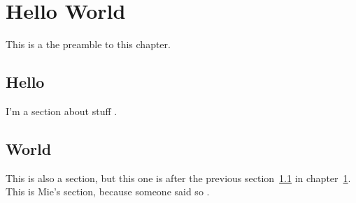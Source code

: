\chapter{Hello World}\label{sec:hello-world}

This is a the preamble to this chapter.

\section{Hello}\label{sec:hello}

I'm a section about stuff \cite{dummy:1}.

\section{World}

This is also a section, but this one is after the previous section~\ref{sec:hello} in chapter~\ref{sec:hello-world}.
\\
This is Mie's section, because someone said so \cite{rubow2000a}.